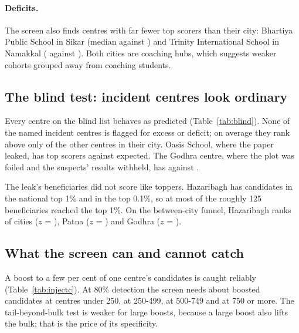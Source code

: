 \documentclass[11pt]{article}
\begin{document}
\paragraph{Deficits.} The screen also finds \DeficitsLayerTwo{} centres with far fewer top scorers than their city: Bhartiya Public School in Sikar (median \ProfSikarbpsOwnMedian{} against \ProfSikarbpsRestMedian) and Trinity International School in Namakkal (\ProfNamakkaltisOwnMedian{} against \ProfNamakkaltisRestMedian). Both cities are coaching hubs, which suggests weaker cohorts grouped away from coaching students.

\subsection{The blind test: incident centres look ordinary}
Every centre on the blind list behaves as predicted (Table~\ref{tab:blind}). None of the \ValListANamed{} named incident centres is flagged for excess or deficit; on average they rank above only \ValListANamedMeanCityPercentile{} of the other centres in their city. Oasis School, where the paper leaked, has \ValTwoSixZeroFourZeroTwoTopOne{} top scorers against \ValTwoSixZeroFourZeroTwoEOne{} expected. The Godhra centre, where the plot was foiled and the suspects' results withheld, has \ValTwoTwoZeroFiveZeroTwoTopOne{} against \ValTwoTwoZeroFiveZeroTwoEOne.

The leak's beneficiaries did not score like toppers. Hazaribagh has \CourtHazaribaghTopOne{} candidates in the national top 1\% and \CourtHazaribaghTopZeroOne{} in the top 0.1\%, so at most \CourtHazaribaghTopOne{} of the roughly 125 beneficiaries reached the top 1\%. On the between-city funnel, Hazaribagh ranks \CourtHazaribaghFunnelRank{} of \FunnelCities{} cities ($z$ = \CourtHazaribaghZFunnel), Patna \CourtPatnaFunnelRank{} ($z$ = \CourtPatnaZFunnel) and Godhra \CourtGodhraFunnelRank{} ($z$ = \CourtGodhraZFunnel).

\begin{table}[htbp]\centering
\caption{The blind list, compiled before marks were analysed. List A: centres in the court and investigation record (Dantewada and Tura are ambiguous: sources do not say which of the city's centres was affected). List B: centres singled out in the press after the release (not blind). In city: rank of the centre's $z$ among its city's centres.}\label{tab:blind}

\end{table}

\subsection{What the screen can and cannot catch}
A boost to a few per cent of one centre's candidates is caught reliably (Table~\ref{tab:injectc}). At 80\% detection the screen needs about \InjectMinMEightZeroLTwoTwoFiveZero{} boosted candidates at centres under 250, \InjectMinMEightZeroLTwoTwoFiveZeroFourNineNine{} at 250-499, \InjectMinMEightZeroLTwoFiveZeroZeroSevenFourNine{} at 500-749 and \InjectMinMEightZeroLTwoSevenFiveZero{} at 750 or more. The tail-beyond-bulk test is weaker for large boosts, because a large boost also lifts the bulk; that is the price of its specificity.
\end{document}
